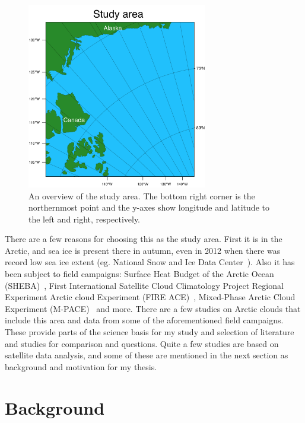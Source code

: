 \begin{figure}
\centering
\includegraphics[width=0.7\textwidth]{introduction/studyarea.png}
\caption{An overview of the study area. The bottom right corner is the northernmost point and the y-axes show longitude and latitude to the left and right, respectively.}
\label{fig:area}
\end{figure}
 
There are a few reasons for choosing this as the study area. First it is in the Arctic, and sea ice is present there in autumn, even in 2012 when there was record low sea ice extent (eg. National Snow and Ice Data Center~\citep{NSIDC}). Also it has been subject to field campaigns: Surface Heat Budget of the Arctic Ocean (SHEBA)~\citep{Uttal2002}, First International Satellite Cloud Climatology Project Regional Experiment Arctic cloud Experiment (FIRE ACE)~\citep{Curry2000}, Mixed-Phase Arctic Cloud Experiment (M-PACE)~\citep{Verlinde2007} and more. There are a few studies on Arctic clouds that include this area and data from some of the aforementioned field campaigns. These provide parts of the science basis for my study and selection of literature and studies for comparison and questions. Quite a few studies are based on satellite data analysis, and some of these are mentioned in the next section as background and motivation for my thesis.

\section{Background}%
\label{sec:background}

